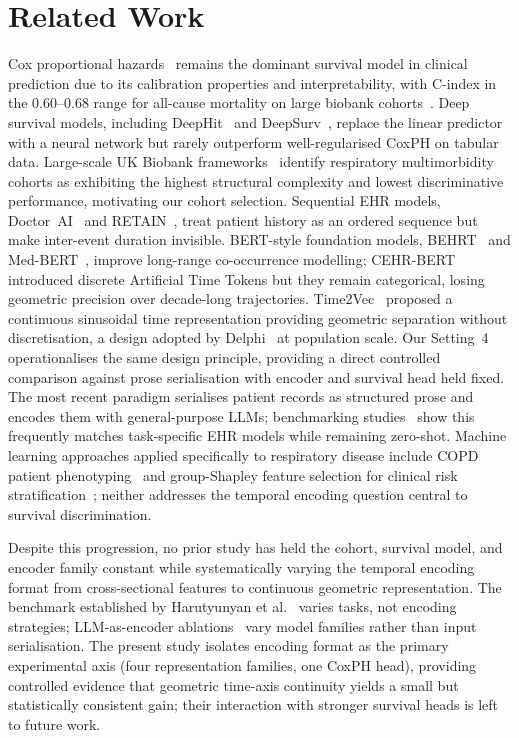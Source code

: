 \section{Related Work}

Cox proportional hazards~\cite{coxph_original} remains the dominant survival
model in clinical prediction due to its calibration properties and
interpretability, with C-index in the 0.60--0.68 range for all-cause
mortality on large biobank cohorts~\cite{harrellcindex}.
Deep survival models, including DeepHit~\cite{deephit} and
DeepSurv~\cite{deepsurv}, replace the linear predictor with a neural network
but rarely outperform well-regularised CoxPH on tabular data.
Large-scale UK Biobank frameworks~\cite{ukbmdrmf} identify respiratory
multimorbidity cohorts as exhibiting the highest structural complexity and
lowest discriminative performance, motivating our cohort selection.
Sequential EHR models, Doctor~AI~\cite{doctorai} and RETAIN~\cite{retain},
treat patient history as an ordered sequence but make inter-event duration
invisible.
BERT-style foundation models, BEHRT~\cite{behrt} and Med-BERT~\cite{medbert},
improve long-range co-occurrence modelling; CEHR-BERT~\cite{cehrbert}
introduced discrete Artificial Time Tokens but they remain categorical,
losing geometric precision over decade-long trajectories.
Time2Vec~\cite{time2vec} proposed a continuous sinusoidal time representation
providing geometric separation without discretisation, a design adopted by
Delphi~\cite{delphi2024} at population scale.
Our Setting~4 operationalises the same design principle, providing a direct
controlled comparison against prose serialisation with encoder and survival
head held fixed.
The most recent paradigm serialises patient records as structured prose and
encodes them with general-purpose LLMs; benchmarking studies~\cite{llmehrenc,serialehr}
show this frequently matches task-specific EHR models while remaining zero-shot.
Machine learning approaches applied specifically to respiratory disease include
COPD patient phenotyping~\cite{wang2025copd} and group-Shapley feature selection
for clinical risk stratification~\cite{luo2026grasp}; neither addresses the
temporal encoding question central to survival discrimination.

Despite this progression, no prior study has held the cohort, survival model,
and encoder family constant while systematically varying the temporal encoding
format from cross-sectional features to continuous geometric representation.
The benchmark established by Harutyunyan et al.~\cite{harutyunyan2019} varies
tasks, not encoding strategies; LLM-as-encoder ablations~\cite{llmehrenc}
vary model families rather than input serialisation.
The present study isolates encoding format as the primary experimental axis
(four representation families, one CoxPH head), providing controlled evidence
that geometric time-axis continuity yields a small but statistically consistent
gain; their interaction with stronger survival heads is left to future work.
